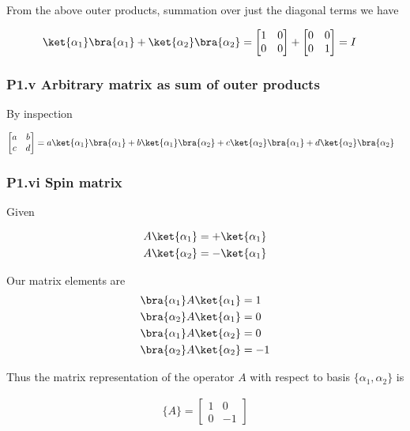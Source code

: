 From the above outer products, summation over just the diagonal terms we have

\begin{align*}
\ket{\alpha_1}\bra{\alpha_1} + \ket{\alpha_2}\bra{\alpha_2} &=
\begin{bmatrix}
1 & 0 \\
0 & 0
\end{bmatrix} +
\begin{bmatrix}
0 & 0 \\
0 & 1
\end{bmatrix} 
= I
\end{align*}

\subsubsection{P1.v Arbitrary matrix as sum of outer products}

By inspection

\begin{align*}
\begin{bmatrix}
a & b \\
c & d
\end{bmatrix} 
&=
a \ket{\alpha_1}\bra{\alpha_1} 
+b \ket{\alpha_1}\bra{\alpha_2} 
+c \ket{\alpha_2}\bra{\alpha_1} 
+d \ket{\alpha_2}\bra{\alpha_2}
\end{align*}

\subsubsection{P1.vi Spin matrix}

Given

\begin{align*}
A \ket{\alpha_1} &= + \ket{\alpha_1} \\
A \ket{\alpha_2} &= - \ket{\alpha_1}
\end{align*}

Our matrix elements are
\begin{align*}
\bra{\alpha_1} A \ket{\alpha_1} &= 1 \\
\bra{\alpha_2} A \ket{\alpha_1} &= 0 \\
\bra{\alpha_1} A \ket{\alpha_2} &= 0 \\
\bra{\alpha_2} A \ket{\alpha_2} &= -1
\end{align*}

Thus the matrix representation of the operator $A$ with respect to basis $\{\alpha_1, \alpha_2\}$ is

\begin{align*}
\{A\} =
\begin{bmatrix}
1 & 0 \\
0 & -1
\end{bmatrix} 
\end{align*}

